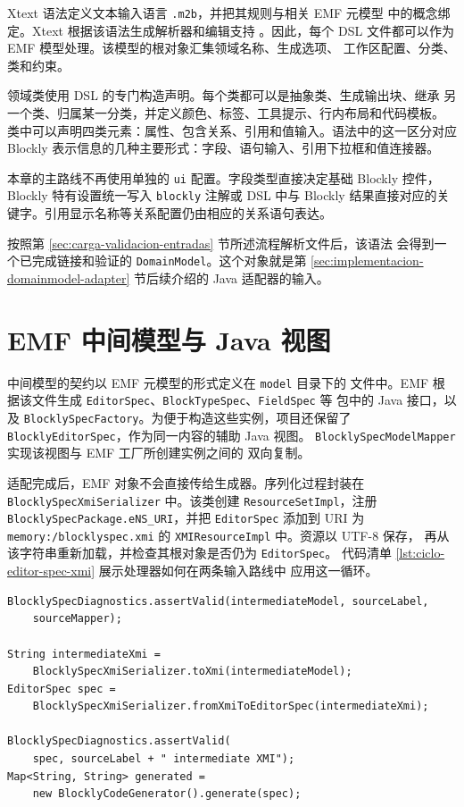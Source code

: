 Xtext 语法定义文本输入语言 \texttt{.m2b}，并把其规则与相关 EMF 元模型
中的概念绑定。Xtext 根据该语法生成解析器和编辑支持
\cite{xtextProject,bettini2013xtext,bettini2015xsemantics}。因此，每个
DSL 文件都可以作为 EMF 模型处理。该模型的根对象汇集领域名称、生成选项、
工作区配置、分类、类和约束。

领域类使用 DSL 的专门构造声明。每个类都可以是抽象类、生成输出块、继承
另一个类、归属某一分类，并定义颜色、标签、工具提示、行内布局和代码模板。
类中可以声明四类元素：属性、包含关系、引用和值输入。语法中的这一区分对应
Blockly 表示信息的几种主要形式：字段、语句输入、引用下拉框和值连接器。

本章的主路线不再使用单独的 \texttt{ui} 配置。字段类型直接决定基础 Blockly
控件，Blockly 特有设置统一写入 \texttt{blockly} 注解或 DSL 中与 Blockly
结果直接对应的关键字。引用显示名称等关系配置仍由相应的关系语句表达。

按照第 \ref{sec:carga-validacion-entradas} 节所述流程解析文件后，该语法
会得到一个已完成链接和验证的 \texttt{DomainModel}。这个对象就是第
\ref{sec:implementacion-domainmodel-adapter} 节后续介绍的 Java 适配器的输入。

\section{EMF 中间模型与 Java 视图}
\label{sec:implementacion-modelo-intermedio}

中间模型的契约以 EMF 元模型的形式定义在 \texttt{model} 目录下的
 文件中。EMF 根据该文件生成
\texttt{EditorSpec}、\texttt{BlockTypeSpec}、\texttt{FieldSpec} 等
 包中的 Java 接口，以及
\texttt{BlocklySpecFactory}。为便于构造这些实例，项目还保留了
\texttt{BlocklyEditorSpec}，作为同一内容的辅助 Java 视图。
\texttt{BlocklySpecModel}\allowbreak\texttt{Mapper} 实现该视图与 EMF
工厂所创建实例之间的
双向复制。

适配完成后，EMF 对象不会直接传给生成器。序列化过程封装在
\texttt{BlocklySpecXmi}\allowbreak\texttt{Serializer} 中。该类创建
\texttt{ResourceSet}\allowbreak\texttt{Impl}，注册
\texttt{BlocklySpecPackage.}\allowbreak\texttt{eNS\_URI}，并把
\texttt{EditorSpec} 添加到 URI 为
\texttt{memory:/}\allowbreak\texttt{blocklyspec.xmi} 的
\texttt{XMIResource}\allowbreak\texttt{Impl} 中。资源以 UTF-8 保存，
再从该字符串重新加载，并检查其根对象是否仍为 \texttt{EditorSpec}。
代码清单 \ref{lst:ciclo-editor-spec-xmi} 展示处理器如何在两条输入路线中
应用这一循环。

\begin{lstlisting}[float=htbp, style=tfmjava, captionpos=t, caption={中间模型的验证、序列化与重新加载}, label={lst:ciclo-editor-spec-xmi}]
BlocklySpecDiagnostics.assertValid(intermediateModel, sourceLabel,
    sourceMapper);

String intermediateXmi =
    BlocklySpecXmiSerializer.toXmi(intermediateModel);
EditorSpec spec =
    BlocklySpecXmiSerializer.fromXmiToEditorSpec(intermediateXmi);

BlocklySpecDiagnostics.assertValid(
    spec, sourceLabel + " intermediate XMI");
Map<String, String> generated =
    new BlocklyCodeGenerator().generate(spec);
\end{lstlisting}
\FloatBarrier


